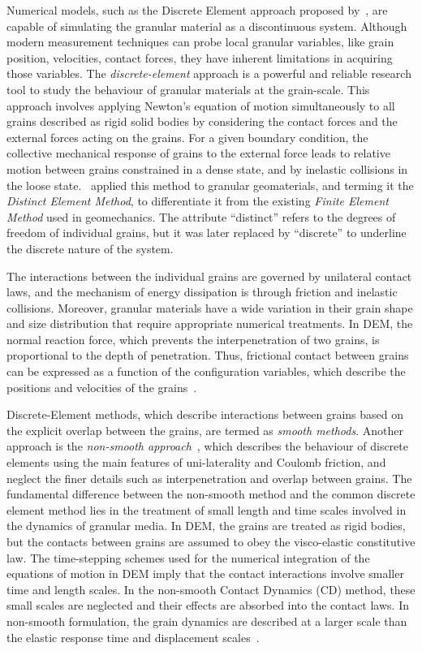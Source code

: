 Numerical models, such as the Discrete Element approach proposed 
by~\citet{Cundall1979a}, are capable of simulating the granular material as a 
discontinuous system. Although modern measurement techniques can probe local 
granular variables, like grain position, velocities, contact 
forces, they have inherent limitations in acquiring those variables. The 
\textit{discrete-element} approach is a powerful and reliable research tool 
to study the behaviour of granular materials at the grain-scale. This approach 
involves applying Newton's equation of motion simultaneously to all grains 
described as rigid solid bodies by considering the contact forces and the 
external forces acting on the grains. For a given boundary condition, the 
collective mechanical response of grains to the external force leads to 
relative motion between grains constrained in a dense state, and by 
inelastic collisions in the loose state.~\citet{Cundall1979a} applied this 
method to granular geomaterials, and terming it the \textit{Distinct Element 
Method}, to differentiate it from the existing \textit{Finite Element Method} 
used in geomechanics. The attribute ``distinct'' refers to the degrees of 
freedom of individual grains, but it was later replaced by ``discrete'' to 
underline the discrete nature of the system. 

The interactions between the individual grains are governed by unilateral 
contact laws, and the mechanism of energy dissipation is through friction and 
inelastic collisions. Moreover, granular materials have a wide variation in 
their grain shape and size distribution that require appropriate numerical 
treatments. In DEM, the normal reaction force, 
which prevents the interpenetration of two grains, is proportional to the depth 
of penetration. Thus, frictional contact between grains can be expressed 
as a function of the configuration variables, which describe the positions and 
velocities of the grains~\citep{Radjai2011}.

Discrete-Element methods, which describe interactions between grains based on 
the explicit overlap between the grains, are termed as \textit{smooth methods}. 
Another approach is the \textit{non-smooth approach}~\citep{Jean1999}, which 
describes the behaviour of discrete elements using the main features of 
uni-laterality and Coulomb friction, and neglect the finer details such 
as interpenetration and overlap between grains. The fundamental difference 
between the non-smooth method and the common discrete element method 
lies in the treatment of small length and time scales involved 
in the dynamics of granular media. In DEM, the grains are treated 
as rigid bodies, but the contacts between grains are assumed to obey the 
visco-elastic constitutive law. The time-stepping schemes used for the 
numerical integration of the equations of motion in DEM imply that the contact 
interactions involve smaller time and length scales. In 
the non-smooth Contact Dynamics (CD) method, these small scales are neglected 
and their effects are absorbed into the contact laws. In non-smooth 
formulation, the grain dynamics are described at a larger scale than the 
elastic response time and displacement scales~\citep{Jean1999, Radjai2009}. 

